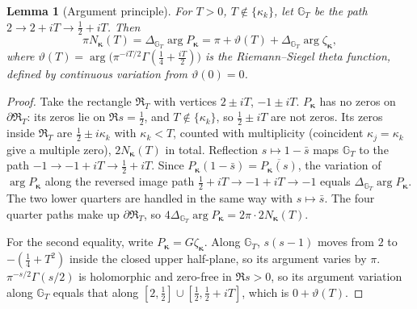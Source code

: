 \documentclass[11pt,reqno]{amsart}
\numberwithin{equation}{section}
\theoremstyle{plain}
\newtheorem{lemma}[theorem]{Lemma}
\theoremstyle{definition}
\theoremstyle{remark}
\begin{document}
\begin{lemma}[Argument principle]\label{lem:rb-argument}
For $T>0$, $T\notin\{\kappa_k\}$, let $\mathbb G_T$ be the path $2\to2+iT\to\frac12+iT$. Then
\begin{equation}\label{eq:rb-arg-principle}
 \pi N_{\boldsymbol\kappa}(T)=\Delta_{\mathbb G_T}\arg P_{\boldsymbol\kappa}
 =\pi+\vartheta(T)+\Delta_{\mathbb G_T}\arg\zeta_{\boldsymbol\kappa},
\end{equation}
where $\vartheta(T)=\arg\bigl(\pi^{-iT/2}\Gamma(\frac14+\frac{iT}2)\bigr)$ is the Riemann--Siegel theta function, defined by continuous variation from $\vartheta(0)=0$.
\end{lemma}

\begin{proof}
Take the rectangle $\mathfrak R_T$ with vertices $2\pm iT$, $-1\pm iT$. $P_{\boldsymbol\kappa}$ has no zeros on $\partial\mathfrak R_T$: its zeros lie on $\Re s=\frac12$, and $T\notin\{\kappa_k\}$, so $\frac12\pm iT$ are not zeros. Its zeros inside $\mathfrak R_T$ are $\frac12\pm i\kappa_k$ with $\kappa_k<T$, counted with multiplicity (coincident $\kappa_j=\kappa_k$ give a multiple zero), $2N_{\boldsymbol\kappa}(T)$ in total. Reflection $s\mapsto1-\bar s$ maps $\mathbb G_T$ to the path $-1\to-1+iT\to\frac12+iT$. Since $P_{\boldsymbol\kappa}(1-\bar s)=\overline{P_{\boldsymbol\kappa}(s)}$, the variation of $\arg P_{\boldsymbol\kappa}$ along the reversed image path $\frac12+iT\to-1+iT\to-1$ equals $\Delta_{\mathbb G_T}\arg P_{\boldsymbol\kappa}$. The two lower quarters are handled in the same way with $s\mapsto\bar s$. The four quarter paths make up $\partial\mathfrak R_T$, so $4\Delta_{\mathbb G_T}\arg P_{\boldsymbol\kappa}=2\pi\cdot2N_{\boldsymbol\kappa}(T)$.

For the second equality, write $P_{\boldsymbol\kappa}=G\zeta_{\boldsymbol\kappa}$. Along $\mathbb G_T$, $s(s-1)$ moves from $2$ to $-(\frac14+T^2)$ inside the closed upper half-plane, so its argument varies by $\pi$. $\pi^{-s/2}\Gamma(s/2)$ is holomorphic and zero-free in $\Re s>0$, so its argument variation along $\mathbb G_T$ equals that along $[2,\frac12]\cup[\frac12,\frac12+iT]$, which is $0+\vartheta(T)$.
\end{proof}
\end{document}
